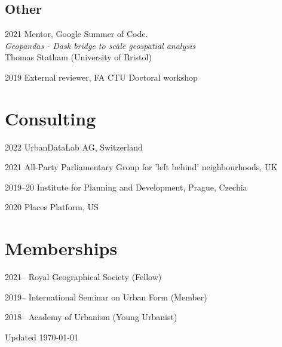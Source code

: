 \documentclass[12pt,a4paper]{report}
\begin{document}
    \subsection*{Other}

    \begin{tablist}

        \item[2021] \tab{}Mentor, Google Summer of Code. \\
                          \textit{Geopandas - Dask bridge to scale geospatial analysis} \\
                          Thomas Statham (University of Bristol)

        \item[2019] \tab{}External reviewer, FA CTU Doctoral workshop

    \end{tablist}

    \section*{Consulting}

    \begin{tablist}

        \item[2022] \tab{}UrbanDataLab AG, Switzerland
        \item[2021] \tab{}All-Party Parliamentary Group for 'left behind' neighbourhoods, UK
        \item[2019--20] \tab{}Institute for Planning and Development, Prague, Czechia
        \item[2020] \tab{}Places Platform, US

    \end{tablist}


    \section*{Memberships}

    \begin{tablist}

        \item[2021--] \tab{}Royal Geographical Society (Fellow)
        \item[2019--] \tab{}International Seminar on Urban Form (Member)
        \item[2018--] \tab{}Academy of Urbanism (Young Urbanist)

    \end{tablist}

    \begin{center}
        \vfill
        Updated \monthyeardate\today
    \end{center}
\end{document}
